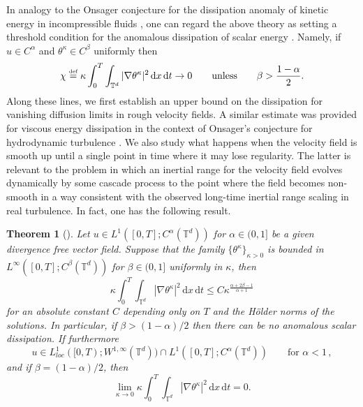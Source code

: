 \documentclass[12pt]{report}   %
\newcommand{\defeq}{\stackrel{\scriptscriptstyle\textup{def}}{=}}
\renewcommand{\le}{\leqslant}
\numberwithin{equation}{section}
\theoremstyle{plain}
\newtheorem{theorem}{Theorem}
\theoremstyle{definition}
\theoremstyle{remark}
\newcommand{\rmd}{\, \mathrm{d}}
\begin{document}
In analogy to the Onsager conjecture for the dissipation anomaly of kinetic energy in incompressible fluids \cite{Onsager49}, one can regard the above theory as setting a threshold condition for the anomalous dissipation of scalar energy \cite{Eyink96}.  Namely, if  $u\in C^\alpha$  and  $\theta^\kappa \in C^\beta$ uniformly  then
\begin{equation}
\chi\defeq  \kappa \int_0^T \int_{\mathbb{T}^d} |\nabla \theta^\kappa|^2 \rmd x \rmd t \to 0 \qquad \text{unless} \qquad \beta>\frac{1-\alpha}{2}. 
\end{equation}
Along these lines, we first establish an upper bound on the dissipation for vanishing diffusion limits in rough velocity fields.  A similar estimate was provided for viscous energy dissipation in the context of Onsager's conjecture for hydrodynamic turbulence \cite{DrivasEyink19}.  We also study what happens when the velocity field is smooth up until a single point in time where it may lose regularity.  The latter is relevant to the problem in which an inertial range for the velocity field evolves dynamically by some cascade process to the point where the field becomes non-smooth in a way consistent with the observed long-time inertial range scaling in real turbulence.  In fact, one has the following result.
\begin{theorem}[{\cite[Theorem~1.4]{DrivasElgindiEA22}}]\label{thm1}
Let $u\in L^1([0,T]; C^\alpha(\mathbb{T}^d))$ for $\alpha\in (0,1]$ be a given divergence free vector field.  Suppose that the family $\{\theta^\kappa\}_{\kappa>0}$ is bounded in $L^\infty([0,T] ; C^\beta(\mathbb{T}^d))$ for $\beta\in (0,1]$ uniformly in $\kappa$, then 
\begin{equation}\label{noanombnd}
 \kappa \int_0^T \int_{\mathbb{T}^d} |\nabla \theta^\kappa|^2 \rmd x \rmd t\le C  \kappa^{\frac{\alpha +2\beta-1}{\alpha+1}}
\end{equation}
for an absolute constant $ C$ depending only on $T$ and the H\"{o}lder norms of the solutions.
In particular, if $\beta>(1-\alpha)/2$ then there can be no anomalous scalar dissipation.  
If furthermore
\begin{equation*}
u\in  L^1_{loc}([0,T); W^{1,\infty}(\mathbb{T}^d))\cap L^1([0,T]; C^\alpha(\mathbb{T}^d))
\qquad
\text{for } \alpha<1\,,
\end{equation*}
 and if $\beta=(1-\alpha)/2$, then 
\begin{equation}
\lim_{\kappa\to 0} \kappa \int_0^T \int_{\mathbb{T}^d} |\nabla \theta^\kappa|^2 \rmd x \rmd t=0.
\end{equation}
\end{theorem}
\end{document}
